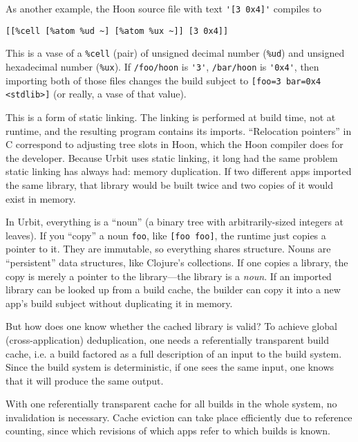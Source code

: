 \documentclass[twoside]{article}
\begin{document}
As another example, the Hoon source file with text \lstinline[style=inlinecode]{'[3 0x4]'} compiles to
\begin{lstlisting}[style=listingblock]
[[%cell [%atom %ud ~] [%atom %ux ~]] [3 0x4]]
\end{lstlisting}
\noindent
This is a vase of a \lstinline[style=inlinecode]{%cell} (pair) of unsigned decimal number (\lstinline[style=inlinecode]{%ud}) and unsigned hexadecimal number (\lstinline[style=inlinecode]{%ux}).  If \lstinline[style=inlinecode]{/foo/hoon} is \lstinline[style=inlinecode]{'3'}, \lstinline[style=inlinecode]{/bar/hoon} is \lstinline[style=inlinecode]{'0x4'}, then importing both of those files changes the build subject to \lstinline[style=inlinecode]{[foo=3 bar=0x4 <stdlib>]} (or really, a vase of that value).

This is a form of static linking.  The linking is performed at build time, not at runtime, and the resulting program contains its imports.  “Relocation pointers” in C correspond to adjusting tree slots in Hoon, which the Hoon compiler does for the developer.  Because Urbit uses static linking, it long had the same problem static linking has always had:  memory duplication.  If two different apps imported the same library, that library would be built twice and two copies of it would exist in memory.

In Urbit, everything is a “noun” (a binary tree with arbi\-trarily-sized integers at leaves).  If you “copy” a noun \lstinline[style=inlinecode]{foo}, like \lstinline[style=inlinecode]{[foo foo]}, the runtime just copies a pointer to it.  They are immutable, so everything shares structure.  Nouns are “persistent” data structures, like Clojure's collections.  If one copies a library, the copy is merely a pointer to the library—the library is a \emph{noun}.  If an imported library can be looked up from a build cache, the builder can copy it into a new app's build subject without duplicating it in memory.  

But how does one know whether the cached library is valid?  To achieve global (cross-application) deduplication, one needs a referentially transparent build cache, i.e. a build factored as a full description of an input to the build system.  Since the build system is deterministic, if one sees the same input, one knows that it will produce the same output.

With one referentially transparent cache for all builds in the whole system, no invalidation is necessary.  Cache eviction can take place efficiently due to reference counting, since which revisions of which apps refer to which builds is known.
\end{document}
